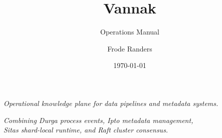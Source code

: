 \documentclass{techdoc}
\date{\today}
\title{Vannak}
\subtitle{Operations Manual}
\author{Frode Randers}
\newcommand{\durga}{Durga}
\newcommand{\ipto}{Ipto}
\newcommand{\sitas}{Sitas}
\newcommand{\raft}{Raft}
\begin{document}
\rhead{}
\maketitle

\vfill
\begin{center}
\textit{Operational knowledge plane for data pipelines and metadata systems.}

\vspace{3mm}
\small\textit{Combining \durga{} process events, \ipto{} metadata management, \\ \sitas{} shard-local runtime, and \raft{} cluster consensus.}
\end{center}
\newpage

\tableofcontents
\newpage

          \newpage
       \newpage
 \newpage
 \newpage
          \newpage
    \newpage
  \newpage
       \newpage
     \newpage
            \newpage
          \newpage
               \newpage
               \newpage
\end{document}
